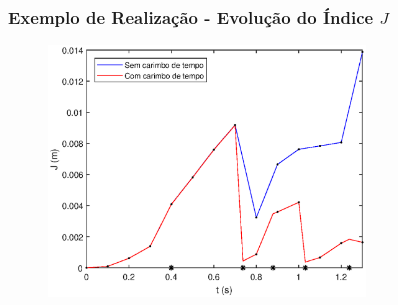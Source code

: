 \documentclass{beamer}
\renewcommand{\(}{\left(}
\renewcommand{\)}{\right)}
\renewcommand{\[}{\left[}
\renewcommand{\]}{\right]}
\begin{document}
\begin{frame}
\frametitle{Exemplo de Realização - Evolução do Índice $J$}

\begin{figure}
	\centering
	\includegraphics[width=0.75\textwidth]{images/J_umarealizacao.eps}
\end{figure}

\end{frame}



%
%
%
%
%
%
%
%
%
\end{document}
